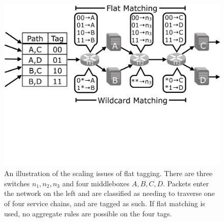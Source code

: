 



\begin{figure}[t!] 
\begin{minipage}{1\linewidth}
\includegraphics[trim={0 10cm 0 0}, clip, width=\linewidth]{figures/mbox_path_example}
\end{minipage} 
\caption{An illustration of the scaling issues of flat tagging. There are three switches $n_1, n_2, n_3$ and four middleboxes $A,B,C,D$. Packets enter the network on the left and are classified as needing to traverse one of four service chains, and are tagged as such. If flat matching is used, no aggregate rules are possible on the four tags.  }
\label{fig:mbox_path}
\end{figure}



